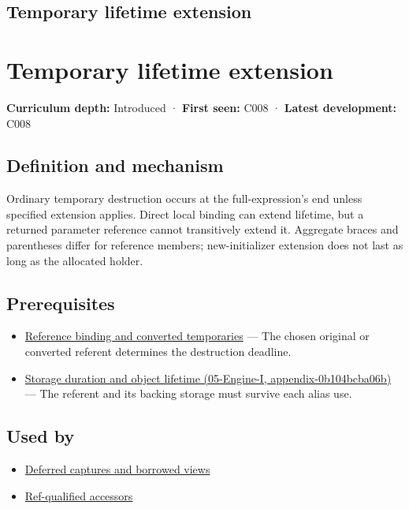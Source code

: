 \hypertarget{appendix-a978b29bbbb0}{}
\section*{Temporary lifetime extension}
\chapter{Temporary lifetime extension}\label{appendix-a978b29bbbb0-temporary-lifetime-extension}

\textbf{Curriculum depth:} Introduced · \textbf{First seen:} C008 · \textbf{Latest development:} C008

\section{Definition and mechanism}\label{appendix-a978b29bbbb0-definition-and-mechanism}

Ordinary temporary destruction occurs at the full-expression's end unless specified extension applies. Direct local binding can extend lifetime, but a returned parameter reference cannot transitively extend it. Aggregate braces and parentheses differ for reference members; new-initializer extension does not last as long as the allocated holder.

\section{Prerequisites}\label{appendix-a978b29bbbb0-prerequisites}

\begin{itemize}
\tightlist
\item
  \hyperref[appendix-37856d997bb0]{Reference binding and converted temporaries} --- The chosen original or converted referent determines the destruction deadline.
\item
  \href{../05-Engine-I/main.pdf\#nameddest=appendix-0b104bcba06b}{Storage duration and object lifetime (05-Engine-I, appendix-0b104bcba06b)} --- The referent and its backing storage must survive each alias use.
\end{itemize}

\section{Used by}\label{appendix-a978b29bbbb0-used-by}

\begin{itemize}
\tightlist
\item
  \hyperref[appendix-aea529eb5175]{Deferred captures and borrowed views}
\item
  \hyperref[appendix-d42039b1d6f7]{Ref-qualified accessors}
\end{itemize}

